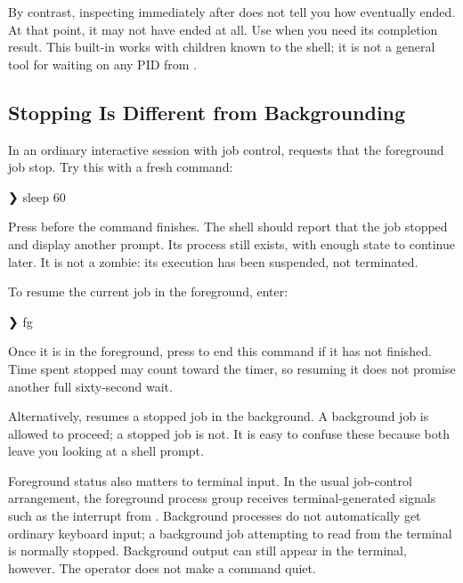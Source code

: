 \documentclass[11pt]{article}
\begin{document}
By contrast, inspecting  immediately after  does not tell you how  eventually ended.
At that point, it may not have ended at all.
Use  when you need its completion result.
This built-in works with children known to the shell; it is not a general tool for waiting on any PID from .

\subsection{Stopping Is Different from Backgrounding}

In an ordinary interactive session with job control,  requests that the foreground job stop.
Try this with a fresh command:

\begin{terminal}[unbreakable]
❯ sleep 60
\end{terminal}

Press  before the command finishes.
The shell should report that the job stopped and display another prompt.
Its process still exists, with enough state to continue later.
It is not a zombie: its execution has been suspended, not terminated.

To resume the current job in the foreground, enter:

\begin{terminal}[unbreakable]
❯ fg
\end{terminal}

Once it is in the foreground, press  to end this  command if it has not finished.
Time spent stopped may count toward the timer, so resuming it does not promise another full sixty-second wait.

Alternatively,  resumes a stopped job in the background.
A background job is allowed to proceed; a stopped job is not.
It is easy to confuse these because both leave you looking at a shell prompt.

Foreground status also matters to terminal input.
In the usual job-control arrangement, the foreground process group receives terminal-generated signals such as the interrupt from .
Background processes do not automatically get ordinary keyboard input; a background job attempting to read from the terminal is normally stopped.
Background output can still appear in the terminal, however.
The \inlinesh{&} operator does not make a command quiet.
\end{document}
